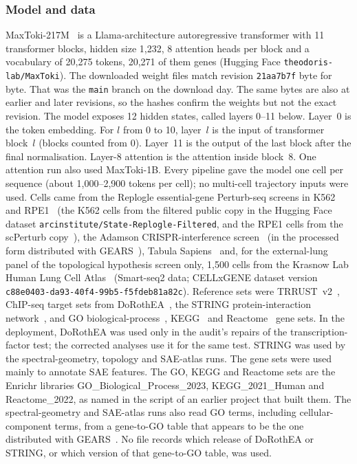 \documentclass[10pt,letterpaper]{article}
\begin{document}
\subsubsection*{Model and data}
MaxToki-217M~\cite{maxtoki2026} is a Llama-architecture autoregressive
transformer with 11 transformer blocks, hidden size 1,232, 8 attention
heads per block and a vocabulary of 20,275 tokens, 20,271 of them genes (Hugging Face
\texttt{theodoris-lab/MaxToki}). The downloaded weight files match
revision \texttt{21aa7b7f} byte for byte. That was the \texttt{main}
branch on the download day. The same bytes are also at earlier and later
revisions, so the hashes confirm the weights but not the exact revision.
The model exposes 12 hidden states, called layers 0--11 below. Layer~0
is the token embedding. For $l$ from 0 to 10, layer~$l$ is the input of
transformer block~$l$ (blocks counted from 0). Layer~11 is the output of
the last block after the final normalisation. Layer-8 attention is the
attention inside block~8. One attention run also used MaxToki-1B. Every pipeline gave
the model one cell per sequence (about 1,000--2,900 tokens per cell); no
multi-cell trajectory inputs were used. Cells came from the Replogle
essential-gene Perturb-seq screens in K562 and
RPE1~\cite{replogle2022perturbseq} (the K562 cells from the filtered public
copy in the Hugging Face dataset \texttt{arcinstitute/State-Replogle-Filtered},
and the RPE1 cells from the scPerturb copy~\cite{peidli2024scperturb}),
the Adamson CRISPR-interference
screen~\cite{adamson2016perturbseq} (in the processed form distributed with
GEARS~\cite{roohani2024gears}), Tabula
Sapiens~\cite{tabulasapiens2022} and, for the external-lung panel of the
topological hypothesis screen only, 1,500 cells from the Krasnow Lab Human
Lung Cell Atlas~\cite{travaglini2020lung} (Smart-seq2 data; CELLxGENE dataset
version \texttt{c88e0403-da93-40f4-99b5-f5fdeb81a82c}). Reference sets were
TRRUST~v2~\cite{han2018trrust}, ChIP-seq target sets from
DoRothEA~\cite{garcia-alonso2019dorothea}, the STRING protein-interaction
network~\cite{szklarczyk2023string}, and GO
biological-process~\cite{ashburner2000go}, KEGG~\cite{kanehisa2000kegg}
and Reactome~\cite{gillespie2022reactome} gene sets. In the
deployment, DoRothEA was used only in the audit's repairs of the
transcription-factor test; the corrected analyses use it for the same
test. STRING was used by the spectral-geometry, topology and SAE-atlas
runs. The gene sets were used mainly to annotate SAE features. The GO,
KEGG and Reactome sets are the Enrichr libraries
GO\_Biological\_Process\_2023, KEGG\_2021\_Human and Reactome\_2022, as
named in the script of an earlier project that built them. The
spectral-geometry and SAE-atlas runs also read GO terms, including
cellular-component terms, from a gene-to-GO table that appears to be the
one distributed with GEARS~\cite{roohani2024gears}. No file records which
release of DoRothEA or STRING, or which version of that gene-to-GO table,
was used.
\end{document}
